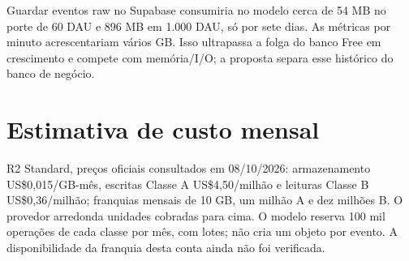 \documentclass[10pt,a4paper]{article}
\begin{document}
Guardar eventos raw no Supabase consumiria no modelo cerca de 54 MB no
porte de 60 DAU e 896 MB em 1.000 DAU, só por sete dias. As métricas por
minuto acrescentariam vários GB. Isso ultrapassa a folga do banco Free
em crescimento e compete com memória/I/O; a proposta separa esse
histórico do banco de negócio.

\clearpage
\section{Estimativa de custo mensal}\label{estimativa-de-custo-mensal}

R2 Standard, preços oficiais consultados em 08/10/2026: armazenamento
US\$0,015/GB-mês, escritas Classe A US\$4,50/milhão e leituras Classe B
US\$0,36/milhão; franquias mensais de 10 GB, um milhão A e dez milhões
B. O provedor arredonda unidades cobradas para cima. O modelo reserva
100 mil operações de cada classe por mês, com lotes; não cria um objeto
por evento. A disponibilidade da franquia desta conta ainda não foi
verificada.
\end{document}
